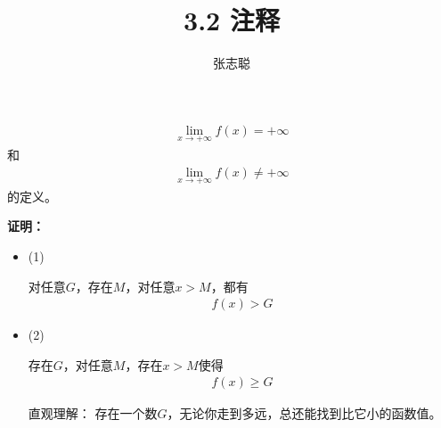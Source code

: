 \documentclass{article}
\begin{document}
\title{3.2 注释}
\author{张志聪}
\maketitle

\begin{zremark}
  \begin{align*}
    \lim\limits_{x \to +\infty} f(x) = +\infty
  \end{align*}
  和
  \begin{align*}
    \lim\limits_{x \to +\infty} f(x) \neq +\infty
  \end{align*}
  的定义。
\end{zremark}

\textbf{证明：}

\begin{itemize}
  \item (1)

        对任意$G$，存在$M$，对任意$x > M$，都有
        \begin{align*}
          f(x) > G
        \end{align*}

  \item (2)

        存在$G$，对任意$M$，存在$x > M$使得
        \begin{align*}
          f(x) \geq G
        \end{align*}

        直观理解： 存在一个数$G$，无论你走到多远，总还能找到比它小的函数值。
\end{itemize}
\end{document}
